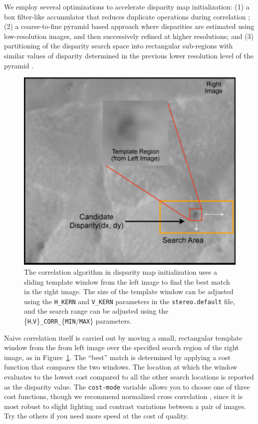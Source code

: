 We employ several optimizations to accelerate disparity map
initialization: (1) a box filter-like accumulator that reduces
duplicate operations during correlation \citep{Sun02rectangular}; (2) a
coarse-to-fine pyramid based approach where disparities are estimated
using low-resolution images, and then successively refined at higher
resolutions; and (3) partitioning of the disparity search space into
rectangular sub-regions with similar values of disparity determined in
the previous lower resolution level of the
pyramid \citep{Sun02rectangular}.

\begin{figure}[bt]
  \centering
  \includegraphics[width=13cm]{images/correlation/correlation_400px.png}
  \caption{The correlation algorithm in disparity map initialization
    uses a sliding template window from the left image to find the
    best match in the right image.  The size of the template window
    can be adjusted using the \texttt{H\_KERN} and \texttt{V\_KERN} parameters in the
    \texttt{stereo.default} file, and the search range can be adjusted
    using the \{\texttt{H},\texttt{V}\}\texttt{\_CORR\_}\{\texttt{MIN}/\texttt{MAX}\} parameters.}
  \label{fig:correlation_window}
\end{figure}

Naive correlation itself is carried out by moving a small, rectangular
template window from the from left image over the specified search
region of the right image, as in Figure~\ref{fig:correlation_window}.
The ``best'' match is determined by applying a cost function that
compares the two windows. The location at which the window evaluates
to the lowest cost compared to all the other search locations is
reported as the disparity value. The \texttt{cost-mode} variable allows you
to choose one of three cost functions, though we recommend normalized
cross correlation \citep{Menard97:robust}, since it is most robust to
slight lighting and contrast variations between a pair of
images. Try the others if you need more speed at the cost of quality.

